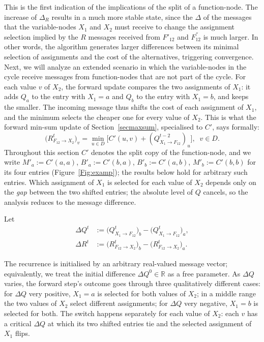 This is the first indication of the implications of the split of a function-node. The increase of $\Delta_R$ results in a much more stable state, since the $\Delta$ of the messages that the variable-nodes $X_1$ and $X_2$ must receive to change the assignment selection implied by the $R$ messages received from $F'_{12}$ and $F^{''}_{12}$ is much larger. In other words, the algorithm generates larger differences between its minimal selection of assignments and the cost of the alternatives, triggering convergence.
Next, we will analyze an extended scenario in which the variable-nodes in the cycle receive messages from function-nodes that are not part of the cycle.
For each value $v$ of $X_2$, the forward update compares the two assignments of $X_1$: it adds $Q_a$ to the entry with $X_1=a$ and $Q_b$ to the entry with $X_1=b$, and keeps the smaller.  The incoming message thus shifts the cost of each assignment of $X_1$, and the minimum selects the cheaper one for every value of $X_2$.  This is what the forward min-sum update of Section~\ref{secmaxsum}, specialised to $C'$, says formally:
\begin{equation}\label{eq:minsumR}
    \bigl(R^t_{F_{12} \to X_2}\bigr)_v = \min_{u \in D}\bigl[C'(u, v) + (Q^{t-2}_{X_1 \to F_{12}})_u\bigr], \;\; v \in D.
\end{equation}
Throughout this section $C'$ denotes the split copy of the function-node, and we write $M'_a := C'(a,a)$, $B'_a := C'(b,a)$, $B'_b := C'(a,b)$, $M'_b := C'(b,b)$ for its four entries (Figure~\ref{Fig:examp}); the results below hold for arbitrary such entries. Which assignment of $X_1$ is selected for each value of $X_2$ depends only on the \emph{gap} between the two shifted entries; the absolute level of $Q$ cancels, so the analysis reduces to the message difference.
\begin{definition}\label{def:deltas}
Let
\[
    \begin{aligned}
        \Delta Q^t &:= \bigl(Q^t_{X_1 \to F_{12}}\bigr)_b - \bigl(Q^t_{X_1 \to F_{12}}\bigr)_a, \\
        \Delta R^t &:= \bigl(R^t_{F_{12} \to X_2}\bigr)_b - \bigl(R^t_{F_{12} \to X_2}\bigr)_a.
    \end{aligned}
\]
\end{definition}
\noindent The recurrence is initialised by an arbitrary real-valued message vector; equivalently, we treat the initial difference $\Delta Q^0 \in \mathbb{R}$ as a free parameter.
As $\Delta Q$ varies, the forward step's outcome goes through three qualitatively different cases: for $\Delta Q$ very positive, $X_1=a$ is selected for both values of $X_2$; in a middle range the two values of $X_2$ select different assignments; for $\Delta Q$ very negative, $X_1=b$ is selected for both.  The switch happens separately for each value of $X_2$: each $v$ has a critical $\Delta Q$ at which its two shifted entries tie and the selected assignment of $X_1$ flips.
